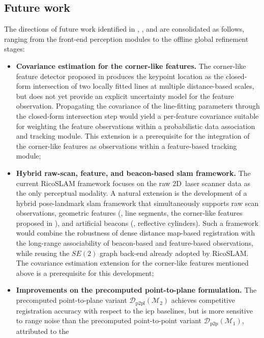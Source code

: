 \subsection{Future work}\label{sec:conclusions:future-work}

The directions of future work identified in
, , and
 are consolidated as follows, ranging from the front-end
perception modules to the offline global refinement stages:
\begin{itemize}
\item \textbf{Covariance estimation for the corner-like features.}
The corner-like feature detector proposed in 
produces the keypoint location as the closed-form intersection of two
locally fitted lines at multiple distance-based scales, but does not
yet provide an explicit uncertainty model for the feature observation.
Propagating the covariance of the line-fitting parameters through the
closed-form intersection step would yield a per-feature covariance
suitable for weighting the feature observations within a probabilistic
data association and tracking module. This extension is a prerequisite
for the integration of the corner-like features as observations within
a feature-based tracking module;
\item \textbf{Hybrid raw-scan, feature, and beacon-based \gls{slam}
framework.}
The current RicoSLAM framework focuses on the raw 2D~laser scanner data
as the only perceptual modality. A natural extension is the
development of a hybrid pose-landmark \gls{slam} framework that
simultaneously supports raw scan observations, geometric features
(\eg, line segments, the corner-like features proposed in
), and artificial beacons (\eg, reflective
cylinders). Such a framework would combine the robustness of dense
distance map-based registration with the long-range associability of
beacon-based and feature-based observations, while reusing the
$SE(2)$ graph back-end already adopted by RicoSLAM. The
covariance estimation extension for the corner-like features mentioned
above is a prerequisite for this development;
\item \textbf{Improvements on the precomputed point-to-plane
formulation.}
The precomputed point-to-plane variant
$\mathcal{D}_\mathrm{p2pl}(\mathcal{M}_2)$ achieves competitive
registration accuracy with respect to the \gls{icp} baselines, but
is more sensitive to range noise than the precomputed point-to-point
variant $\mathcal{D}_\mathrm{p2p}(\mathcal{M}_1)$, attributed to the

\end{itemize}
